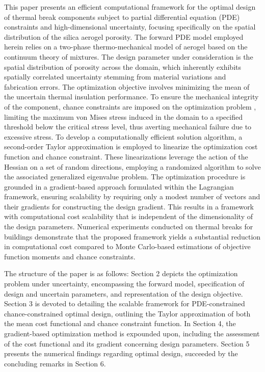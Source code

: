 \documentclass[pdf-a,balance,colorlinks,upint,subscriptcorrection,varvw,mathalfa=cal=boondoxo, spanish,french,vietnamese,russian,greek]{asmeconf}
\begin{document}
This paper presents an efficient computational framework for the optimal design of thermal break components subject to partial differential equation (PDE) constraints and high-dimensional uncertainty, focusing specifically on the spatial distribution of the silica aerogel porosity.
The forward PDE model employed herein relies on a two-phase thermo-mechanical model of aerogel based on the continuum theory of mixtures. The design parameter under consideration is the spatial distribution of porosity across the domain, which inherently exhibits spatially correlated uncertainty stemming from material variations and fabrication errors.
The optimization objective involves minimizing the mean of the uncertain thermal insulation performance. To ensure the mechanical integrity of the component, chance constraints are imposed on the optimization problem \cite{chen2019taylor,chen2021taylor}, limiting the maximum von Mises stress induced in the domain to a specified threshold below the critical stress level, thus averting mechanical failure due to excessive stress.
To develop a computationally efficient solution algorithm, a second-order Taylor approximation is employed to linearize the optimization cost function and chance constraint. These linearizations leverage the action of the Hessian on a set of random directions, employing a randomized algorithm to solve the associated generalized eigenvalue problem.
The optimization procedure is grounded in a gradient-based approach formulated within the Lagrangian framework, ensuring scalability by requiring only a modest number of vectors and their gradients for constructing the design gradient. This results in a framework with computational cost scalability that is independent of the dimensionality of the design parameters.
Numerical experiments conducted on thermal breaks for buildings demonstrate that the proposed framework yields a substantial reduction in computational cost compared to Monte Carlo-based estimations of objective function moments and chance constraints.

The structure of the paper is as follows: Section 2 depicts the optimization problem under uncertainty, encompassing the forward model, specification of design and uncertain parameters, and representation of the design objective. Section 3 is devoted to detailing the scalable framework for PDE-constrained chance-constrained optimal design, outlining the Taylor approximation of both the mean cost functional and chance constraint function. In Section 4, the gradient-based optimization method is expounded upon, including the assessment of the cost functional and its gradient concerning design parameters. Section 5 presents the numerical findings regarding optimal design, succeeded by the concluding remarks in Section 6.
\end{document}
